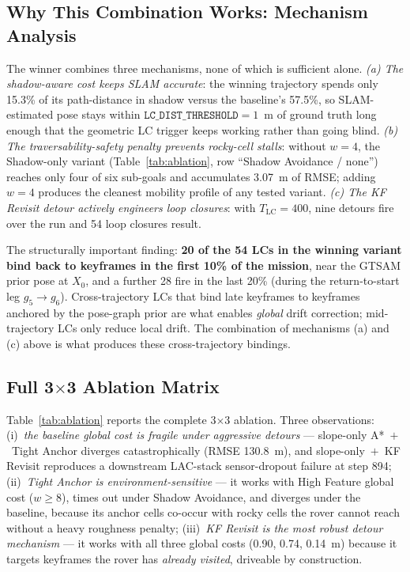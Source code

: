 \documentclass[letterpaper,times]{IONconf}
\begin{document}
\subsection{Why This Combination Works: Mechanism Analysis}
\label{sec:mechanism}

The winner combines three mechanisms, none of which is sufficient alone. \emph{(a) The shadow-aware cost keeps SLAM accurate}: the winning trajectory spends only 15.3\% of its path-distance in shadow versus the baseline's 57.5\%, so SLAM-estimated pose stays within $\texttt{LC\_DIST\_THRESHOLD} = 1$~m of ground truth long enough that the geometric LC trigger keeps working rather than going blind. \emph{(b) The traversability-safety penalty prevents rocky-cell stalls}: without $w = 4$, the Shadow-only variant (Table~\ref{tab:ablation}, row ``Shadow Avoidance / none'') reaches only four of six sub-goals and accumulates 3.07~m of RMSE; adding $w = 4$ produces the cleanest mobility profile of any tested variant. \emph{(c) The KF Revisit detour actively engineers loop closures}: with $T_{\text{LC}} = 400$, nine detours fire over the run and 54 loop closures result.

The structurally important finding: \textbf{20 of the 54 LCs in the winning variant bind back to keyframes in the first 10\% of the mission}, near the GTSAM prior pose at $X_0$, and a further 28 fire in the last 20\% (during the return-to-start leg $g_5 \to g_6$). Cross-trajectory LCs that bind late keyframes to keyframes anchored by the pose-graph prior are what enables \emph{global} drift correction; mid-trajectory LCs only reduce local drift. The combination of mechanisms (a) and (c) above is what produces these cross-trajectory bindings.

\subsection{Full 3$\times$3 Ablation Matrix}

Table~\ref{tab:ablation} reports the complete 3$\times$3 ablation. Three observations: (i)~\emph{the baseline global cost is fragile under aggressive detours} --- slope-only A*~$+$~Tight Anchor diverges catastrophically (RMSE 130.8~m), and slope-only~$+$~KF Revisit reproduces a downstream LAC-stack sensor-dropout failure at step 894; (ii)~\emph{Tight Anchor is environment-sensitive} --- it works with High Feature global cost ($w \ge 8$), times out under Shadow Avoidance, and diverges under the baseline, because its anchor cells co-occur with rocky cells the rover cannot reach without a heavy roughness penalty; (iii)~\emph{KF Revisit is the most robust detour mechanism} --- it works with all three global costs (0.90, 0.74, 0.14~m) because it targets keyframes the rover has \emph{already visited}, driveable by construction.
\end{document}
